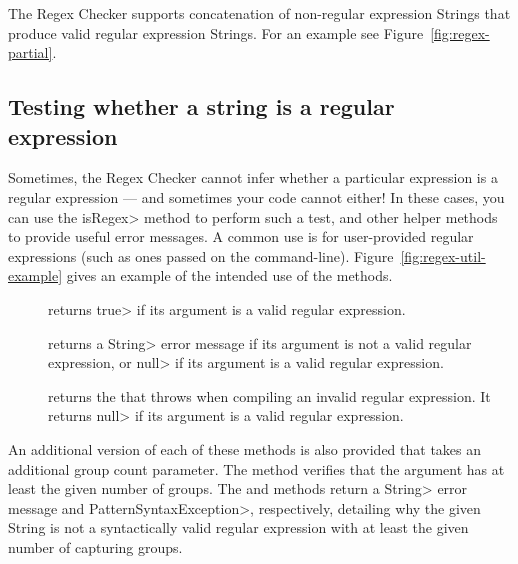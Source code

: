 The Regex Checker supports concatenation of non-regular expression Strings
that produce valid regular expression Strings. For an example see
Figure~\ref{fig:regex-partial}.


\subsection{Testing whether a string is a regular expression\label{regexutil-methods}}

Sometimes, the Regex Checker cannot infer whether a particular expression
is a regular expression --- and sometimes your code cannot either!  In
these cases, you can use the \<isRegex> method to perform such a test, and
other helper methods to provide useful error messages.  A
common use is for user-provided regular expressions (such as ones passed
on the command-line).
Figure~\ref{fig:regex-util-example} gives an
example of the intended use of the  methods.

\begin{description}

\item[]
  returns \<true> if its argument is a valid regular expression.

\item[]
  returns a \<String> error message if its argument is not a valid regular
  expression, or \<null> if its argument is a valid regular expression.

\item[]
  returns the
  that 
  throws when compiling an invalid regular expression.  It returns \<null>
  if its argument is a valid regular expression.

\end{description}

An additional version of each of these methods is also provided that takes
an additional group count parameter. The
 method
verifies that the argument has at least the given number of groups. The
 and
methods return a \<String> error message and \<Pattern\-Syntax\-Exception>,
respectively, detailing why the given String is not a syntactically valid
regular expression with at least the given number of capturing groups.


